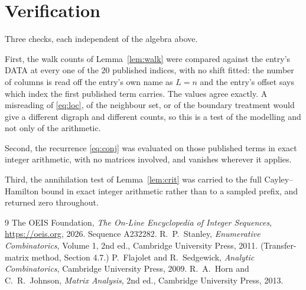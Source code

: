 \documentclass[11pt,a4paper]{article}
\theoremstyle{plain}
\theoremstyle{definition}
\begin{document}
\section{Verification}

Three checks, each independent of the algebra above.

First, the walk counts of Lemma~\ref{lem:walk} were compared against the entry's DATA at
every one of the $20$ published indices, with no shift fitted: the number of columns is
read off the entry's own name as $L=n$ and the entry's offset says which index the first
published term carries. The values agree exactly. A misreading of \eqref{eq:loc}, of the
neighbour set, or of the boundary treatment would give a different digraph and different
counts, so this is a test of the modelling and not only of the arithmetic.

Second, the recurrence \eqref{eq:conj} was evaluated on those published terms in exact
integer arithmetic, with no matrices involved, and vanishes wherever it applies.

Third, the annihilation test of Lemma~\ref{lem:crit} was carried to the full
Cayley--Hamilton bound in exact integer arithmetic rather than to a sampled prefix, and
returned zero throughout.

\begin{thebibliography}{9}
 The OEIS Foundation, \emph{The On-Line Encyclopedia of Integer
Sequences}, \url{https://oeis.org}, 2026. Sequence A232282.
 R.~P.~Stanley, \emph{Enumerative Combinatorics}, Volume 1, 2nd ed.,
Cambridge University Press, 2011. (Transfer-matrix method, Section 4.7.)
 P.~Flajolet and R.~Sedgewick, \emph{Analytic Combinatorics}, Cambridge
University Press, 2009.
 R.~A.~Horn and C.~R.~Johnson, \emph{Matrix Analysis}, 2nd ed., Cambridge
University Press, 2013.
\end{thebibliography}
\end{document}
